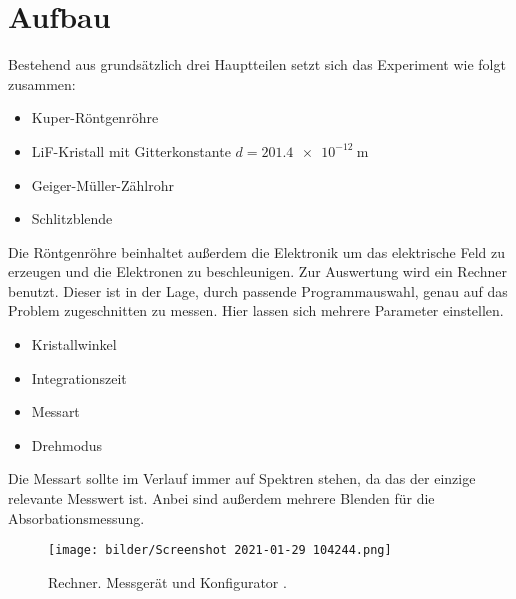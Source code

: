\section{Aufbau}
Bestehend aus grundsätzlich drei Hauptteilen setzt sich das Experiment wie folgt zusammen:
\begin{itemize}
    \item{Kuper-Röntgenröhre}
     \item{LiF-Kristall mit Gitterkonstante $d = \SI{201.4e-12}{\meter}$}
     \item{Geiger-Müller-Zählrohr}
     \item{Schlitzblende}
\end{itemize}
Die Röntgenröhre beinhaltet außerdem die Elektronik um das elektrische Feld zu erzeugen und die Elektronen zu beschleunigen.
Zur Auswertung wird ein Rechner benutzt. Dieser ist in der Lage, durch passende Programmauswahl, genau auf das Problem zugeschnitten zu messen. 
Hier lassen sich mehrere Parameter einstellen. 
\begin{itemize}
     \item{Kristallwinkel}
     \item{Integrationszeit}
     \item{Messart}
     \item{Drehmodus}
\end{itemize}
Die Messart sollte im Verlauf immer auf Spektren stehen, da das der einzige relevante Messwert ist. Anbei sind außerdem mehrere Blenden für die Absorbationsmessung.

\begin{figure}
    \centering
    \texttt{[image: bilder/Screenshot 2021-01-29 104244.png]}
    \caption{Rechner. Messgerät und Konfigurator \cite{skript}. } 
    \label{fig:Rechner}
\end{figure}